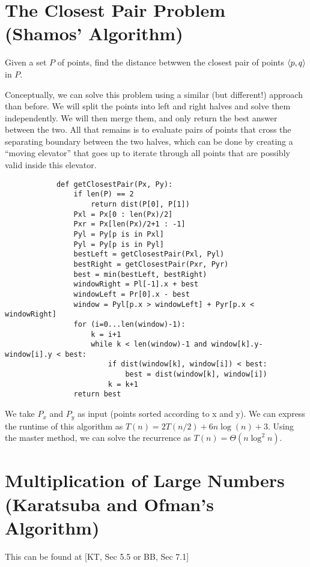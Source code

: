     \section{The Closest Pair Problem (Shamos' Algorithm)}
        Given a set $P$ of points, find the distance betwwen the closest pair of
        points $\left \langle p, q \right \rangle $ in $P$.

        Conceptually, we can solve this problem using a similar (but different!)
        approach than before. We will split the points into left and right
        halves and solve them independently. We will then merge them, and only
        return the best answer between the two. All that remains is to evaluate
        pairs of points that cross the separating boundary between the two
        halves, which can be done by creating a ``moving elevator'' that goes up
        to iterate through all points that are possibly valid inside this
        elevator.

        \begin{verbatim}
            def getClosestPair(Px, Py):
                if len(P) == 2
                    return dist(P[0], P[1])
                Pxl = Px[0 : len(Px)/2]
                Pxr = Px[len(Px)/2+1 : -1]
                Pyl = Py[p is in Pxl]
                Pyl = Py[p is in Pyl]
                bestLeft = getClosestPair(Pxl, Pyl)
                bestRight = getClosestPair(Pxr, Pyr)
                best = min(bestLeft, bestRight)
                windowRight = Pl[-1].x + best
                windowLeft = Pr[0].x - best
                window = Pyl[p.x > windowLeft] + Pyr[p.x < windowRight]
                for (i=0...len(window)-1):
                    k = i+1
                    while k < len(window)-1 and window[k].y-window[i].y < best:
                        if dist(window[k], window[i]) < best:
                            best = dist(window[k], window[i])
                        k = k+1
                return best
        \end{verbatim}
        We take $P_x$ and $P_y$ as input (points sorted according to x and y).
        We can express the runtime of this algorithm as
        $T(n) = 2T(n/2) + 6n \log(n) + 3$. Using the master method, we can solve
        the recurrence as $T(n) = \Theta(n \log^2 n)$.

    \section{Multiplication of Large Numbers (Karatsuba and Ofman's Algorithm)}
        This can be found at [KT, Sec 5.5 or BB, Sec 7.1]

